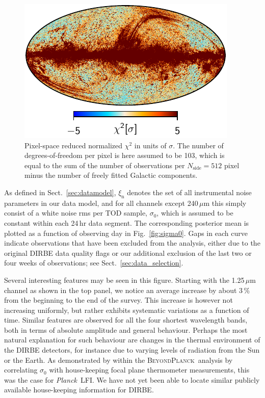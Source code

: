 \documentclass{aa}
\def\Planck{\textit{Planck}}
\newcommand{\BP}{\textsc{BeyondPlanck}}
\begin{document}
       \begin{figure}
       	\centering
       	\includegraphics[width=\linewidth]{figs/chisq_CG02_c1_v2.pdf}
       	\caption{Pixel-space reduced normalized $\chi^2$ in units of $\sigma$. The number of degrees-of-freedom per pixel is here assumed to be 103, which is equal to the sum of the number of observations per $N_{\mathrm{side}}=512$ pixel minus the number of freely fitted Galactic components. }
       	\label{fig:chisq}
       \end{figure}



As defined in Sect.~\ref{sec:datamodel}, $\xi_{\mathrm{n}}$ denotes
the set of all instrumental noise parameters in our data model, and
for all channels except 240$\,\mu$m this simply consist of a white
noise rms per TOD sample, $\sigma_0$, which is assumed to be constant
within each 24\,hr data segment. The corresponding posterior mean is
plotted as a function of observing day in Fig.~\ref{fig:sigma0}. Gaps
in each curve indicate observations that have been excluded from the
analysis, either due to the original DIRBE data quality flags or our
additional exclusion of the last two or four weeks of observations;
see Sect.~\ref{sec:data_selection}.

Several interesting features may be seen in this figure. Starting with
the 1.25$\,\mu$m channel as shown in the top panel, we notice an
average increase by about 3\,\% from the beginning to the end of the
survey. This increase is however not increasing uniformly, but rather
exhibits systematic variations as a function of time. Similar features
are observed for all the four shortest wavelength bands, both in terms
of absolute amplitude and general behaviour. Perhaps the most natural
explanation for such behaviour are changes in the thermal environment
of the DIRBE detectors, for instance due to varying levels of
radiation from the Sun or the Earth. As demonstrated by \citet{bp06}
within the \BP\ analysis by correlating $\sigma_0$ with house-keeping
focal plane thermometer measurements, this was the case for
\Planck\ LFI. We have not yet been able to locate
similar publicly available house-keeping information for DIRBE.
\end{document}
